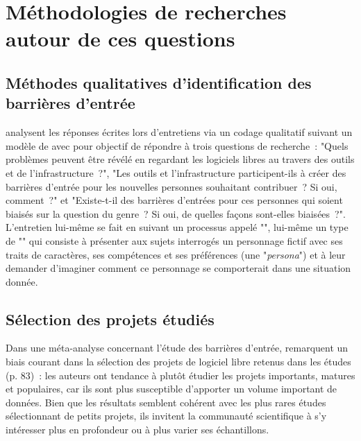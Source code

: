\section{Méthodologies de recherches autour de ces questions}

\subsection{Méthodes qualitatives d'identification des barrières d'entrée}

\textcite[p.~1006]{barriers-2018} analysent les réponses écrites lors d'entretiens via un codage qualitatif
suivant un modèle de  avec pour objectif de répondre à trois questions de
recherche : "Quels problèmes peuvent être révélé en regardant les logiciels libres au travers des outils et de
l'infrastructure ?", "Les outils et l'infrastructure participent-ils à créer des barrières d'entrée pour les
nouvelles personnes souhaitant contribuer ? Si oui, comment ?" et "Existe-t-il des barrières d'entrées pour
ces personnes qui soient biaisés sur la question du genre ? Si oui, de quelles façons sont-elles biaisées ?".
L'entretien lui-même se fait en suivant un processus appelé "", lui-même un type de
"" qui consiste à présenter aux sujets interrogés un personnage fictif avec ses
traits de caractères, ses compétences et ses préférences (une "\emph{persona}") et à leur demander d'imaginer
comment ce personnage se comporterait dans une situation donnée.

\subsection{Sélection des projets étudiés}

Dans une méta-analyse concernant l'étude des barrières d'entrée,  remarquent
un biais courant dans la sélection des projets de logiciel libre retenus dans les études (p. 83) : les auteurs
ont tendance à plutôt étudier les projets importants, matures et populaires, car ils sont plus susceptible
d'apporter un volume important de données. Bien que les résultats semblent cohérent avec les plus rares études
sélectionnant de petits projets, ils invitent la communauté scientifique à s'y intéresser plus en profondeur
ou à plus varier ses échantillons.



